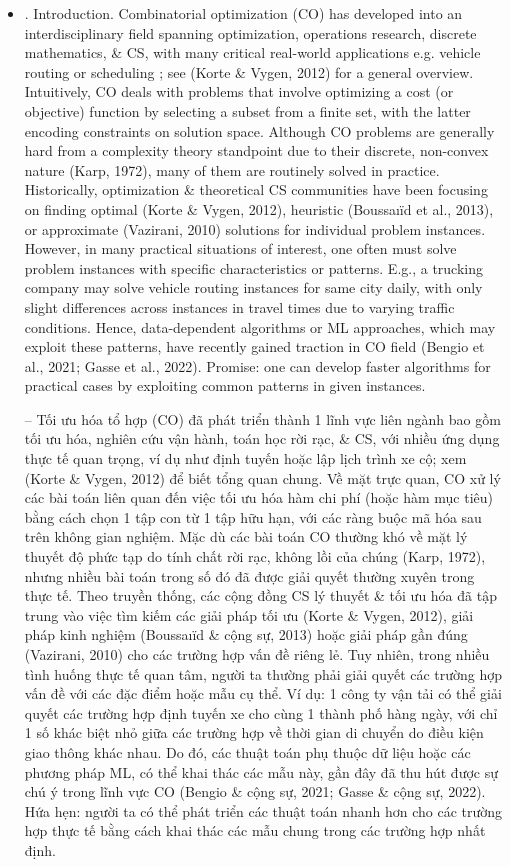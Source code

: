 \documentclass{article}
\begin{document}
\begin{itemize}
    {\bf Keywords.} Combinatorial optimization, graph neural networks, reasoning.
   \item {. Introduction.} Combinatorial optimization (CO) has developed into an interdisciplinary field spanning optimization, operations research, discrete mathematics, \& CS, with many critical real-world applications e.g. vehicle routing or scheduling ; see (Korte \& Vygen, 2012) for a general overview. Intuitively, CO deals with problems that involve optimizing a cost (or objective) function by selecting a subset from a finite set, with the latter encoding constraints on solution space. Although CO problems are generally hard from a complexity theory standpoint due to their discrete, non-convex nature (Karp, 1972), many of them are routinely solved in practice. Historically, optimization \& theoretical CS communities have been focusing on finding optimal (Korte \& Vygen, 2012), heuristic (Boussaı\"id et al., 2013), or approximate (Vazirani, 2010) solutions for individual problem instances. However, in many practical situations of interest, one often must solve problem instances with specific characteristics or patterns. E.g., a trucking company may solve vehicle routing instances for same city daily, with only slight differences across instances in travel times due to varying traffic conditions. Hence, data-dependent algorithms or ML approaches, which may exploit these patterns, have recently gained traction in CO field (Bengio et al., 2021; Gasse et al., 2022). Promise: one can develop faster algorithms for practical cases by exploiting common patterns in given instances.

   -- Tối ưu hóa tổ hợp (CO) đã phát triển thành 1 lĩnh vực liên ngành bao gồm tối ưu hóa, nghiên cứu vận hành, toán học rời rạc, \& CS, với nhiều ứng dụng thực tế quan trọng, ví dụ như định tuyến hoặc lập lịch trình xe cộ; xem (Korte \& Vygen, 2012) để biết tổng quan chung. Về mặt trực quan, CO xử lý các bài toán liên quan đến việc tối ưu hóa hàm chi phí (hoặc hàm mục tiêu) bằng cách chọn 1 tập con từ 1 tập hữu hạn, với các ràng buộc mã hóa sau trên không gian nghiệm. Mặc dù các bài toán CO thường khó về mặt lý thuyết độ phức tạp do tính chất rời rạc, không lồi của chúng (Karp, 1972), nhưng nhiều bài toán trong số đó đã được giải quyết thường xuyên trong thực tế. Theo truyền thống, các cộng đồng CS lý thuyết \& tối ưu hóa đã tập trung vào việc tìm kiếm các giải pháp tối ưu (Korte \& Vygen, 2012), giải pháp kinh nghiệm (Boussaı\"id \& cộng sự, 2013) hoặc giải pháp gần đúng (Vazirani, 2010) cho các trường hợp vấn đề riêng lẻ. Tuy nhiên, trong nhiều tình huống thực tế quan tâm, người ta thường phải giải quyết các trường hợp vấn đề với các đặc điểm hoặc mẫu cụ thể. Ví dụ: 1 công ty vận tải có thể giải quyết các trường hợp định tuyến xe cho cùng 1 thành phố hàng ngày, với chỉ 1 số khác biệt nhỏ giữa các trường hợp về thời gian di chuyển do điều kiện giao thông khác nhau. Do đó, các thuật toán phụ thuộc dữ liệu hoặc các phương pháp ML, có thể khai thác các mẫu này, gần đây đã thu hút được sự chú ý trong lĩnh vực CO (Bengio \& cộng sự, 2021; Gasse \& cộng sự, 2022). Hứa hẹn: người ta có thể phát triển các thuật toán nhanh hơn cho các trường hợp thực tế bằng cách khai thác các mẫu chung trong các trường hợp nhất định.


\end{itemize}
\end{document}
